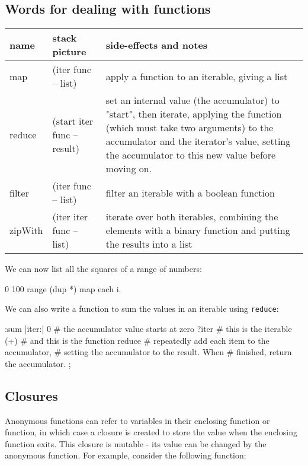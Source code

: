 \subsection{Words for dealing with functions}
\begin{center}
\begin{tabular}{|l|l|p{4in}|}\hline
\textbf{name} & \textbf{stack picture} & \textbf{side-effects and notes}\\ \hline
map &(iter func -- list) & apply a function to an iterable, giving a list\\
reduce & (start iter func -- result) & set an internal value (the accumulator) to "start", then iterate, applying the function (which must take two arguments) to the accumulator and the iterator's value, setting the accumulator to this new value before moving on.\\
filter & (iter func -- list) & filter an iterable with a boolean function\\
zipWith & (iter iter func -- list) & iterate over both iterables, combining
the elements with a binary function and putting the results into a list\\
\hline
\end{tabular}
\end{center}
We can now list all the squares of a range of numbers:
\begin{v}
0 100 range (dup *) map each {i.}
\end{v}


We can also write a function to sum the values in an iterable using
\texttt{reduce}:
\begin{v}
:sum |iter:|
    0           # the accumulator value starts at zero
    ?iter       # this is the iterable
    (+)         # and this is the function 
    reduce      # repeatedly add each item to the accumulator,
                # setting the accumulator to the result. When
                # finished, return the accumulator.
;
\end{v}



\subsection{Closures}
Anonymous functions can refer to variables in their enclosing function or
function, in which case a closure is created to store the value when the enclosing
function exits. This closure is mutable - its value can be changed by the
anonymous function. For example, consider the following function:

